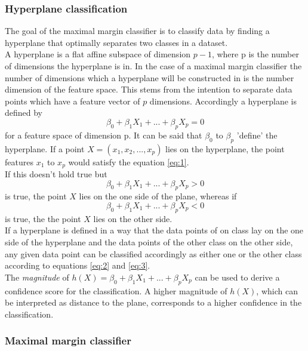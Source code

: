 \subsubsection{Hyperplane classification}
The goal of the maximal margin classifier is to classify data by finding a hyperplane that optimally separates two classes in a dataset. 
\\
A hyperplane is a flat affine subspace of dimension $p-1$, where p is the number of dimensions the hyperplane is in. In the case of a maximal margin classifier the number of dimensions which a hyperplane will be constructed in is the number dimension of the feature space. This stems from the intention to separate data points which have a feature vector of $p$ dimensions. Accordingly a hyperplane is defined by
\begin{equation} \label{eq:1}
\beta_0 + \beta_1 X_1 + ... + \beta_p X_p = 0
\end{equation}
for a feature space of dimension p. It can be said that $\beta_0$  to $\beta_p$ 'define' the hyperplane.
If a point $X=(x_1,x_2,...,x_p)$ lies on the hyperplane, the point features $x_1$ to $x_p$ would satisfy the equation \ref{eq:1}.
\\
If this doesn't hold true but
\begin{equation} \label{eq:2}
\beta _0 + \beta _1 X_1 + ... + \beta_p X_p > 0
\end{equation}
is true, the point $X$ lies on the one side of the plane, whereas if 
\begin{equation} \label{eq:3}
\beta_0 + \beta_1 X_1 + ... + \beta_p X_p < 0
\end{equation}
is true, the the point $X$ lies on the other side. 
\\
If a hyperplane is defined in a way that the data points of on class lay on the one side of the hyperplane and the data points of the other class on the other side, any given data point can be classified accordingly as either one or the other class according to equations \ref{eq:2} and \ref{eq:3}.
\\
The \emph{magnitude} of $h(X)=\beta _0 + \beta _1 X_1 + ... + \beta_p X_p$ can be used to derive a confidence score for the classification. A higher magnitude of $h(X)$, which can be interpreted as distance to the plane, corresponds to a higher confidence in the classification.


\subsubsection{Maximal margin classifier}

